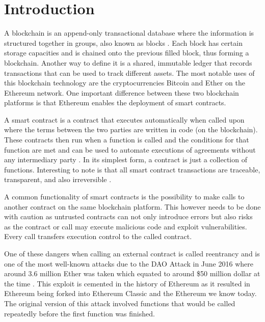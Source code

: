 \documentclass[10pt,conference]{IEEEtran}
\begin{document}
\section{Introduction}

A blockchain is an append-only transactional database where the information is structured together in groups, also known as blocks \cite{smart_inspect, smarter}. Each block has certain storage capacities and is chained onto the previous filled block, thus forming a blockchain. Another way to define it is a shared, immutable ledger that records transactions that can be used to track different assets. The most notable uses of this blockchain technology are the cryptocurrencies Bitcoin\cite{article} and Ether \cite{ethereum, white_paper} on the Ethereum network. One important difference between these two blockchain platforms is that Ethereum enables the deployment of smart contracts.

A smart contract is a contract that executes automatically when called upon where the terms between the two parties are written in code (on the blockchain). These contracts then run when a function is called and the conditions for that function are met and can be used to automate executions of agreements without any intermediary party \cite{criminal, 10.1145/2993600.2993611, smarter}. In its simplest form, a contract is just a collection of functions. Interesting to note is that all smart contract transactions are traceable, transparent, and also irreversible \cite{smart_inspect, smarter}.

A common functionality of smart contracts is the possibility to make calls to another contract on the same blockchain platform. This however needs to be done with caution as untrusted contracts can not only introduce errors but also risks as the contract or call may execute malicious code and exploit vulnerabilities. Every call transfers execution control to the called contract.

One of these dangers when calling an external contract is called reentrancy and is one of the most well-known attacks due to the DAO Attack in June 2016 where around 3.6 million Ether was taken which equated to around \$50 million dollar at the time \cite{10.1007/978-3-662-54455-6_8}. This exploit is cemented in the history of Ethereum as it resulted in Ethereum being forked into Ethereum Classic and the Ethereum we know today.
The original version of this attack involved functions that would be called repeatedly before the first function was finished.
\end{document}
